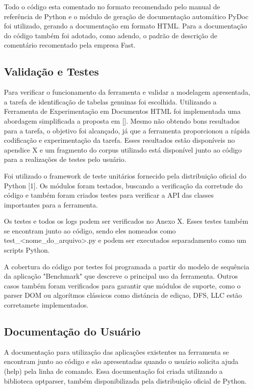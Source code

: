 \documentclass[12pt, a4paper]{article}
\begin{document}
Todo o código esta comentado no formato recomendado pelo manual de
referência de Python e o  módulo de geração de documentação automático
PyDoc foi utilizado, gerando a documentação em formato HTML. Para a
documentação do código também foi adotado, como adendo, o padrão de 
descrição de comentário recomentado pela empresa Fast.

\subsection{Validação e Testes}

Para verificar o funcionamento da ferramenta e validar a modelagem apresentada, a tarefa de identificação de tabelas genuinas foi escolhida. Utilizando a Ferramenta de Experimentação em Documentos HTML foi implementada uma abordagem simplificada a proposta em []. Mesmo não obtendo bons resultados para a tarefa, o objetivo foi alcançado, já que a ferramenta proporcionou a rápida codificação e experimentação da tarefa. Esses resultados estão disponíveis no apendice X e um fragmento do corpus utilizado está disponível junto ao código para a realizações de testes pelo usuário.

Foi utilizado o framework de teste unitários fornecido pela distribuição
oficial do Python [1]. Os módulos foram testados, buscando a verificação
da corretude do código e também foram criados testes para verificar a
API das classes importantes para a ferramenta.

Os testes e todos os logs podem ser verificados no Anexo X. Esses testes
também se encontram junto ao código, sendo eles nomeados como
test\_<nome\_do\_arquivo>.py e podem ser executados separadamento como
um scripts Python.

A cobertura do código por testes foi programada a partir do modelo de
sequência da aplicação "Benchmark" que descreve o principal uso da
ferramenta. Outros casos também foram verificados para garantir que
módulos de suporte, como o parser DOM ou algorítmos clássicos como
distáncia de ediçao, DFS, LLC estão corretamete
implementados.

\subsection{Documentação do Usuário}

A documentação para utilização das aplicações existentes na ferramenta
se encontram junto ao código e são apresentadas quando o usuário
solicita ajuda (help) pela linha de comando. Essa documentação foi
criada utilizando a biblioteca optparser, também disponibilizada pela
distribuição oficial de Python.
\end{document}
